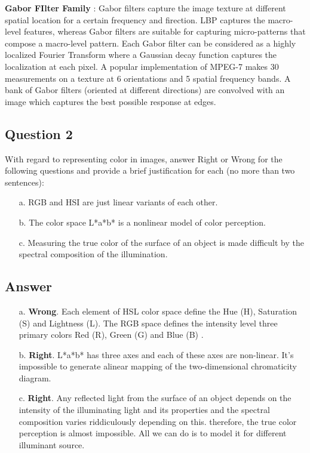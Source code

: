 \documentclass{article}
\begin{document}
\par \textbf{Gabor FIlter Family} : Gabor filters capture the image texture at different spatial location for a certain frequency and firection. LBP captures the macro-level features, whereas Gabor filters are suitable for capturing micro-patterns that compose a macro-level pattern. Each Gabor filter can be considered as a highly localized Fourier Transform where a Gaussian decay function captures the localization at each pixel. A popular implementation of MPEG-7 makes 30 measurements on a texture at 6 orientations and 5 spatial frequency bands. A bank of Gabor filters (oriented at different directions) are convolved with an image which captures the best possible response at edges. 
\subsection{Question 2}
With regard to representing color in images, answer Right or Wrong for the following questions and provide a brief justification for each (no more than two sentences):
\begin{itemize}
	\item[a.] RGB and HSI are just linear variants of each other.
	\item[b.] The color space L*a*b* is a nonlinear model of color perception.
	\item[c.] Measuring the true color of the surface of an object is made difficult by the spectral composition of the illumination.
\end{itemize}
\subsection*{Answer}
\begin{itemize}
	\item[a.] \textbf{Wrong}. Each element of HSL color space define the Hue (H), Saturation (S) and Lightness (L). The RGB space defines the intensity level three primary colors Red (R), Green (G) and Blue (B) .
	\item[b.] \textbf{Right}. L*a*b* has three axes and each of these axes are non-linear. It's impossible to generate alinear mapping of the two-dimensional chromaticity diagram.
	\item[c.] \textbf{Right}. Any reflected light from the surface of an object depends on the intensity of the illuminating light and its properties and the spectral composition varies riddiculously depending on this. therefore, the true color perception is almost impossible. All we can do is to model it for different illuminant source.
\end{itemize}
\end{document}
